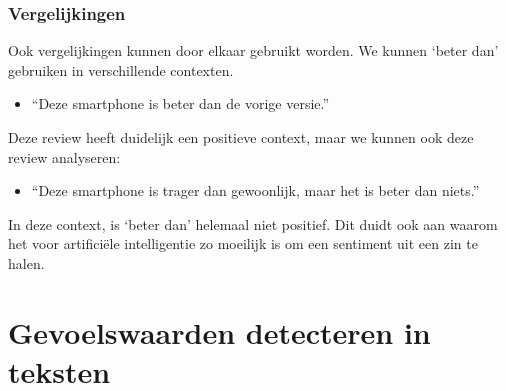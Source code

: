 \subsubsection{Vergelijkingen}
\label{vergelijkingen}

Ook vergelijkingen kunnen door elkaar gebruikt worden. We kunnen ‘beter dan’ gebruiken in verschillende contexten. 

\begin{itemize}
    \item “Deze smartphone is beter dan de vorige versie.”
\end{itemize}

Deze review heeft duidelijk een positieve context, maar we kunnen ook deze review analyseren:


\begin{itemize}
    \item “Deze smartphone is trager dan gewoonlijk, maar het is beter dan niets.”
\end{itemize}

In deze context, is ‘beter dan’ helemaal niet positief. Dit duidt ook aan waarom het voor artificiële intelligentie zo moeilijk is om een sentiment uit een zin te halen. 


\section{Gevoelswaarden detecteren in teksten}
\label{gevoelswaardendetecteren}




